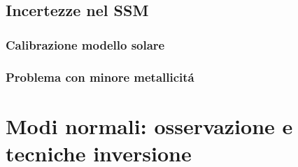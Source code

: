 \documentclass[../main.tex]{subfiles}
\begin{document}
\begin{refsection}

\nocite{*}

\section{Incertezze nel SSM}

\begingroup
\let\clearpage\relax

\endgroup

\subsection{Calibrazione modello solare}

\subsection{Problema con minore metallicit\'a}

\end{refsection}


\chapter{Modi normali: osservazione e tecniche inversione}
\end{document}
